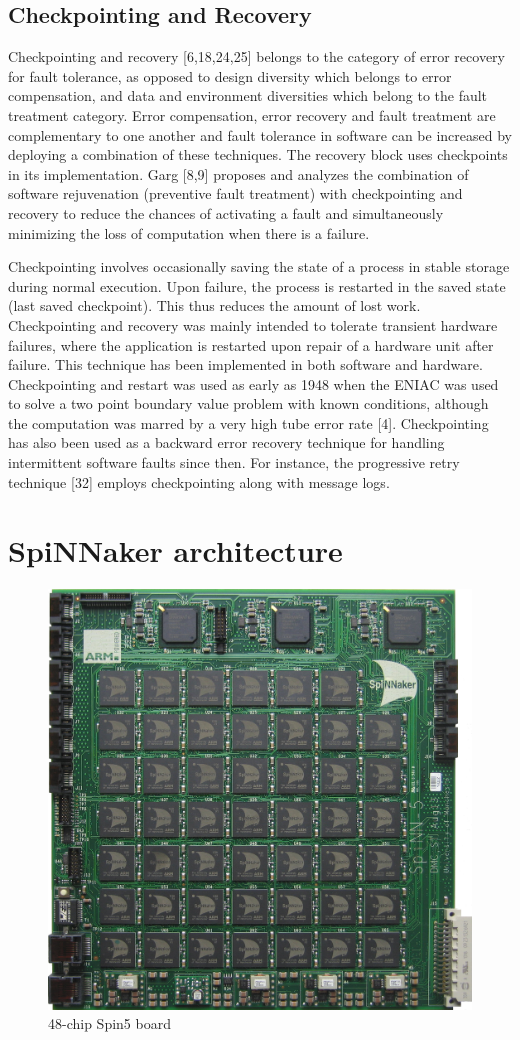 \documentclass[oneside, a4paper, 11pt]{memoir}
\begin{document}
\subsection{Checkpointing and Recovery}
Checkpointing and recovery [6,18,24,25] belongs to the category of error recovery for fault tolerance, as opposed to design diversity which belongs to error compensation, and data and environment diversities which belong to the fault treatment category. Error compensation, error recovery and fault treatment are complementary to one another and fault tolerance in software can be increased by deploying a combination of these techniques. The recovery block uses checkpoints in its implementation. Garg [8,9] proposes and analyzes the combination of software rejuvenation (preventive fault treatment) with checkpointing and recovery to reduce the chances of activating a fault and simultaneously minimizing the loss of computation when there is a failure.

Checkpointing involves occasionally saving the state of a process in stable storage during normal execution. Upon failure, the process is restarted in the saved state (last saved checkpoint). This thus reduces the amount of lost work. Checkpointing and recovery was mainly intended to tolerate transient hardware failures, where the application is restarted upon repair of a hardware unit after failure. This technique has been implemented in both software and hardware. Checkpointing and restart was used as early as 1948 when the ENIAC was used to solve a two point boundary value problem with known conditions, although the computation was marred by a very high tube error rate [4]. Checkpointing has also been used as a backward error recovery technique for handling intermittent software faults since then. For instance, the progressive retry technique [32] employs checkpointing along with message logs.

\newpage
\section{SpiNNaker architecture}
\begin{figure}[htbp]
	\centering
	\includegraphics[width=0.6\linewidth]{images/spin5.jpg}
	\caption{48-chip Spin5 board}
\end{figure}
\end{document}
